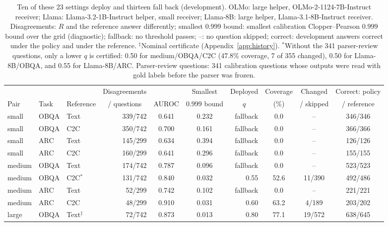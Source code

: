 \begin{table}[!htbp]\centering\scriptsize
\caption{Ten of these 23 settings deploy and thirteen fall back (development). OLMo: large helper, OLMo-2-1124-7B-Instruct receiver; Llama: Llama-3.2-1B-Instruct helper, small receiver; Llama-8B: large helper, Llama-3.1-8B-Instruct receiver. Disagreements: $R$ and the reference answer differently; smallest 0.999 bound: smallest calibration Clopper--Pearson $0.999$ bound over the grid (diagnostic); fallback: no threshold passes; --: no question skipped; correct: development answers correct under the policy and under the reference. $^\ddagger$Nominal certificate (Appendix~\ref{app:history}). $^{*}$Without the 341 parser-review questions, only a lower $q$ is certified: 0.50 for medium/OBQA/C2C (47.8\% coverage, 7 of 355 changed), 0.50 for Llama-8B/OBQA, and 0.55 for Llama-8B/ARC. Parser-review questions: 341 calibration questions whose outputs were read with gold labels before the parser was frozen.}
\label{tab:dev_full}
\renewcommand{\arraystretch}{1.1}\setlength{\tabcolsep}{2.5pt}
\begin{tabular*}{\linewidth}{@{}lll@{\hspace{5pt}\extracolsep{\fill}}rccrccc@{}}\toprule
& & & \multicolumn{1}{c}{Disagreements} & & Smallest & Deployed & Coverage & Changed & Correct: policy\\
Pair & Task & Reference & \multicolumn{1}{c}{/ questions} & AUROC & 0.999 bound & \multicolumn{1}{c}{$q$} & (\%) & / skipped & / reference\\\midrule
small & OBQA & Text & 339/742 & 0.641 & 0.232 & fallback & 0.0 & -- & 346/346\\
small & OBQA & C2C & 350/742 & 0.700 & 0.161 & fallback & 0.0 & -- & 366/366\\
small & ARC & Text & 145/299 & 0.634 & 0.394 & fallback & 0.0 & -- & 126/126\\
small & ARC & C2C & 160/299 & 0.641 & 0.296 & fallback & 0.0 & -- & 155/155\\\midrule
medium & OBQA & Text & 174/742 & 0.787 & 0.096 & fallback & 0.0 & -- & 523/523\\
medium & OBQA & C2C$^{*}$ & 131/742 & 0.840 & 0.032 & 0.55 & 52.6 & 11/390 & 492/486\\
medium & ARC & Text & 52/299 & 0.742 & 0.102 & fallback & 0.0 & -- & 221/221\\
medium & ARC & C2C & 48/299 & 0.910 & 0.031 & 0.60 & 63.2 & 4/189 & 203/202\\\midrule
large & OBQA & Text$^\ddagger$ & 72/742 & 0.873 & 0.013 & 0.80 & 77.1 & 19/572 & 638/645\\

\end{tabular*}
\end{table}
